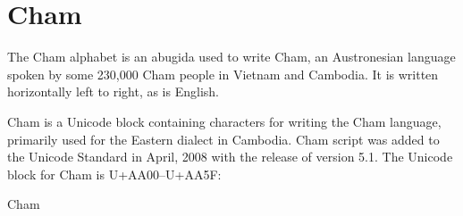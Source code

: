 \section{Cham}
\label{s:cham}

The Cham alphabet is an abugida used to write Cham, an Austronesian language spoken by some 230,000 Cham people in Vietnam and Cambodia. It is written horizontally left to right, as is English.

\newfontfamily{}

Cham is a Unicode block containing characters for writing the Cham language, primarily used for the Eastern dialect in Cambodia.
Cham script was added to the Unicode Standard in April, 2008 with the release of version 5.1.
The Unicode block for Cham is \textsc{U+AA00–U+AA5F}:

\begin{scriptexample}[]{Cham}
\end{scriptexample}


